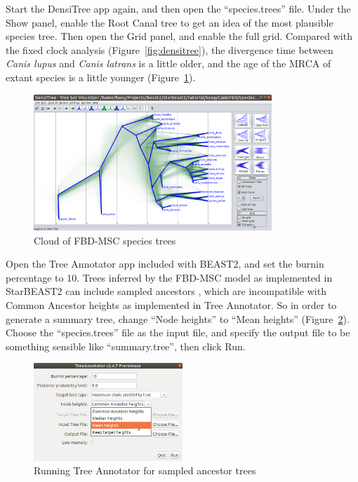 \documentclass[12pt]{article}
\begin{document}
Start the DensiTree app again, and then open the ``species.trees'' file. Under
the Show panel, enable the Root Canal tree to get an idea of the most
plausible species tree. Then open the Grid panel, and enable the full grid.
Compared with the fixed clock analysis (Figure~\ref{fig:densitree}), the
divergence time between \textit{Canis lupus} and \textit{Canis latrans} is a
little older, and the age of the MRCA of extant species is a little younger
(Figure~\ref{fig:densitreeSA}).

\begin{figure}[htb!]
\centering
\includegraphics[width=0.8\textwidth]{figures/densitreeSA.png}
\caption
{Cloud of FBD-MSC species trees}
\label{fig:densitreeSA}
\end{figure}

\clearpage

Open the Tree Annotator app included with BEAST2, and set the burnin
percentage to 10. Trees inferred by the FBD-MSC model as implemented in
StarBEAST2 can include sampled ancestors \citep{Gavryushkina2014}, which are
incompatible with Common Ancestor heights \citep{Heled2013} as implemented in
Tree Annotator. So in order to generate a summary tree, change ``Node heights'' to
``Mean heights'' (Figure~\ref{fig:treeAnnotatorMeanHeights}). Choose the
``species.trees'' file as the input file, and specify the output file to be
something sensible like ``summary.tree'', then click Run.

\begin{figure}[htb!]
\centering
\includegraphics[width=0.5\textwidth]{figures/treeAnnotatorMeanHeights.png}
\caption
{Running Tree Annotator for sampled ancestor trees}
\label{fig:treeAnnotatorMeanHeights}
\end{figure}
\end{document}
